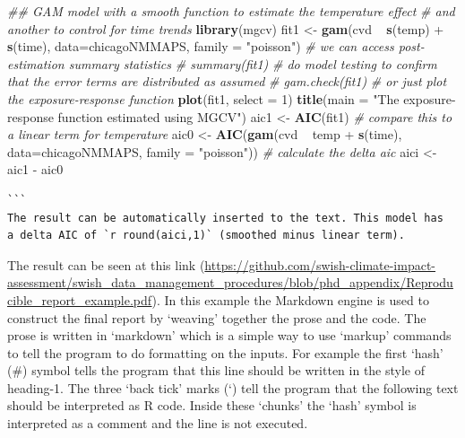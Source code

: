 \documentclass[11pt,a4paper]{article}
\newenvironment{Shaded}{\begin{snugshade}}{\end{snugshade}}
\newcommand{\KeywordTok}[1]{\textcolor[rgb]{0.13,0.29,0.53}{\textbf{{#1}}}}
\newcommand{\DataTypeTok}[1]{\textcolor[rgb]{0.13,0.29,0.53}{{#1}}}
\newcommand{\DecValTok}[1]{\textcolor[rgb]{0.00,0.00,0.81}{{#1}}}
\newcommand{\StringTok}[1]{\textcolor[rgb]{0.31,0.60,0.02}{{#1}}}
\newcommand{\CommentTok}[1]{\textcolor[rgb]{0.56,0.35,0.01}{\textit{{#1}}}}
\newcommand{\NormalTok}[1]{{#1}}
\begin{document}
\begin{small}
\begin{singlespace}
\begin{Shaded}
\begin{Shaded}
\begin{Highlighting}[]
\CommentTok{## GAM model with a smooth function to estimate the temperature effect}
\CommentTok{# and another to control for time trends}
\KeywordTok{library}\NormalTok{(mgcv)}
\NormalTok{fit1 <-}\StringTok{ }\KeywordTok{gam}\NormalTok{(cvd ~}\StringTok{ }\KeywordTok{s}\NormalTok{(temp) +}\StringTok{ }\KeywordTok{s}\NormalTok{(time), }\DataTypeTok{data=}\NormalTok{chicagoNMMAPS, }\DataTypeTok{family =} \StringTok{"poisson"}\NormalTok{) }
\CommentTok{# we can access post-estimation summary statistics}
\CommentTok{# summary(fit1)}
\CommentTok{# do model testing to confirm that the error terms are distributed as assumed}
\CommentTok{# gam.check(fit1)}
\CommentTok{# or just plot the exposure-response function}
\KeywordTok{plot}\NormalTok{(fit1, }\DataTypeTok{select =} \DecValTok{1}\NormalTok{)}
\KeywordTok{title}\NormalTok{(}\DataTypeTok{main =} \StringTok{"The exposure-response function estimated using MGCV"}\NormalTok{)}
\NormalTok{aic1 <-}\StringTok{ }\KeywordTok{AIC}\NormalTok{(fit1)}
\CommentTok{# compare this to a linear term for temperature}
\NormalTok{aic0 <-}\StringTok{ }\KeywordTok{AIC}\NormalTok{(}\KeywordTok{gam}\NormalTok{(cvd ~}\StringTok{ }\NormalTok{temp +}\StringTok{ }\KeywordTok{s}\NormalTok{(time), }\DataTypeTok{data=}\NormalTok{chicagoNMMAPS, }\DataTypeTok{family =} \StringTok{"poisson"}\NormalTok{))}
\CommentTok{# calculate the delta aic}
\NormalTok{aici <-}\StringTok{ }\NormalTok{aic1 -}\StringTok{ }\NormalTok{aic0 }
\end{Highlighting}
\end{Shaded}
\begin{BVerbatim}
```
The result can be automatically inserted to the text. This model has
a delta AIC of `r round(aici,1)` (smoothed minus linear term).
\end{BVerbatim}
\end{Shaded}
\end{singlespace}
\end{small}
\clearpage
The result can be seen at this link (\url{https://github.com/swish-climate-impact-assessment/swish_data_management_procedures/blob/phd_appendix/Reproducible_report_example.pdf}). In this example the Markdown engine is used to construct the final report by `weaving' together the prose and the code.  The prose is written in `markdown' which is a simple way to use `markup' commands to tell the program to do formatting on the inputs.  For example the first `hash' (\#) symbol tells the program that this line should be written in the style of heading-1.  The three `back tick' marks (`) tell the program that the following text should be interpreted as R code.  Inside these `chunks' the `hash' symbol is interpreted as a comment and the line is not executed.
\end{document}

